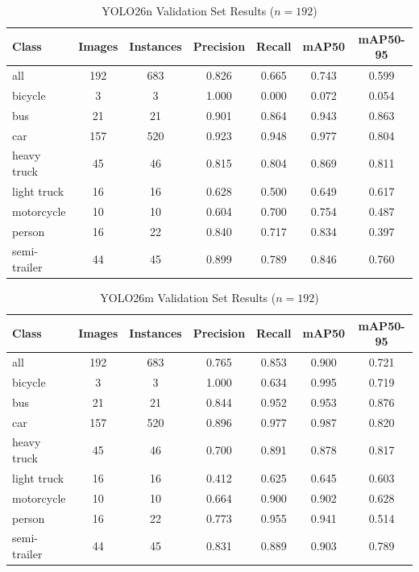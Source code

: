 \begin{table}[H]
\centering
\caption{YOLO26n Validation Set Results ($n=192$)}
\label{tab:val_results_n}
\begin{tabular}{lcccccc}
\hline
\textbf{Class} & \textbf{Images} & \textbf{Instances} & \textbf{Precision} & \textbf{Recall} & \textbf{mAP50} & \textbf{mAP50-95} \\
\midrule
all & 192 & 683 & 0.826 & 0.665 & 0.743 & 0.599 \\
\midrule
bicycle & 3 & 3 & 1.000 & 0.000 & 0.072 & 0.054 \\
bus & 21 & 21 & 0.901 & 0.864 & 0.943 & 0.863 \\
car & 157 & 520 & 0.923 & 0.948 & 0.977 & 0.804 \\
heavy truck & 45 & 46 & 0.815 & 0.804 & 0.869 & 0.811 \\
light truck & 16 & 16 & 0.628 & 0.500 & 0.649 & 0.617 \\
motorcycle & 10 & 10 & 0.604 & 0.700 & 0.754 & 0.487 \\
person & 16 & 22 & 0.840 & 0.717 & 0.834 & 0.397 \\
semi-trailer & 44 & 45 & 0.899 & 0.789 & 0.846 & 0.760 \\ \hline
\end{tabular}
\end{table}

\begin{table}[H]
\centering
\caption{YOLO26m Validation Set Results ($n=192$)}
\label{tab:val_results_m}
\begin{tabular}{lcccccc}
\toprule
\textbf{Class} & \textbf{Images} & \textbf{Instances} & \textbf{Precision} & \textbf{Recall} & \textbf{mAP50} & \textbf{mAP50-95} \\ 
\midrule
all & 192 & 683 & 0.765 & 0.853 & 0.900 & 0.721 \\
\midrule
bicycle & 3 & 3 & 1.000 & 0.634 & 0.995 & 0.719 \\
bus & 21 & 21 & 0.844 & 0.952 & 0.953 & 0.876 \\
car & 157 & 520 & 0.896 & 0.977 & 0.987 & 0.820 \\
heavy truck & 45 & 46 & 0.700 & 0.891 & 0.878 & 0.817 \\
light truck & 16 & 16 & 0.412 & 0.625 & 0.645 & 0.603 \\
motorcycle & 10 & 10 & 0.664 & 0.900 & 0.902 & 0.628 \\
person & 16 & 22 & 0.773 & 0.955 & 0.941 & 0.514 \\
semi-trailer & 44 & 45 & 0.831 & 0.889 & 0.903 & 0.789 \\ 
\bottomrule
\end{tabular}
\end{table}


